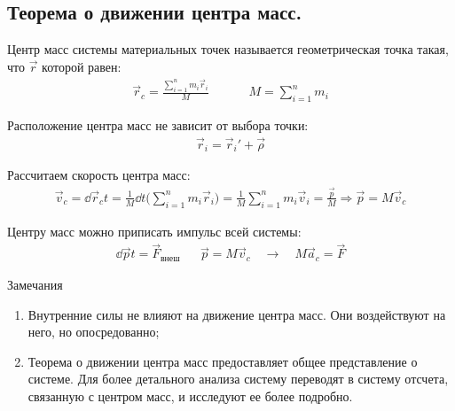 \subsection{\textbf{Теорема о движении центра масс.}}

Центр масс системы материальных точек называется геометрическая точка такая, что $\vec{r}$ которой равен:
\[\begin{aligned}
	\vec{r}_c = \frac{\sum_{i=1}^{n} m_i \vec{r}_i}{M} &&&& M = \sum_{i=1}^{n} m_i
\end{aligned}\]

Расположение центра масс не зависит от выбора точки:
\begin{multline*}
	\vec{r}_i = \vec{r}_i' + \vec{\rho}
\end{multline*}

Рассчитаем скорость центра масс:
\begin{multline*}
	\vec{v}_c = \dd{\vec{r}_c}{t} = \frac{1}{M} \dd{}{t} \Big(\sum_{i=1}^{n} m_i \vec{r}_{i}\Big) = \frac{1}{M} \sum_{i=1}^{n} m_i \vec{v}_i = \frac{\vec{p}}{M} \Rightarrow \boxed{\vec{p} = M \vec{v}_c}
\end{multline*}

Центру масс можно приписать импульс всей системы:
\begin{align*}
	\dd{\vec{p}}{t} = \vec{F}_{\text{внеш}} && \vec{p} = M\vec{v}_c \quad\to\quad M\vec{a}_c = \vec{F}
\end{align*}

\begin{tbox}{Замечания}
	\begin{enumerate}
		\item Внутренние силы не влияют на движение центра масс. Они воздействуют на него, но опосредованно;
		\item Теорема о движении центра масс предоставляет общее представление о системе. Для более детального анализа систему переводят в систему отсчета, связанную с центром масс, и исследуют ее более подробно.
	\end{enumerate}
\end{tbox}